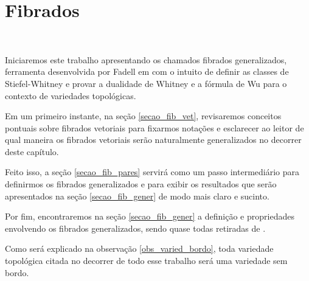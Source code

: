 \documentclass[12pt,oneside]{book} %
\begin{document}





\chapter{Fibrados}\label{cap_fib}
\thispagestyle{empty}

\

\par Iniciaremos este trabalho apresentando os chamados fibrados generalizados, ferramenta desenvolvida por Fadell em \cite{fadell_1} com o intuito de definir as classes de Stiefel-Whitney e provar a dualidade de Whitney e a fórmula de Wu para o contexto de variedades topológicas.

\par Em um primeiro instante, na seção \ref{secao_fib_vet}, revisaremos conceitos pontuais sobre fibrados vetoriais para fixarmos notações e esclarecer ao leitor de qual maneira os fibrados vetoriais serão naturalmente generalizados no decorrer deste capítulo.

\par Feito isso, a seção \ref{secao_fib_pares} servirá como um passo intermediário para definirmos os fibrados generalizados e para exibir os resultados que serão apresentados na seção \ref{secao_fib_gener} de modo mais claro e sucinto.

\par Por fim, encontraremos na seção \ref{secao_fib_gener} a definição e propriedades envolvendo os fibrados generalizados, sendo quase todas retiradas de \cite{fadell_1}.

\par Como será explicado na observação \ref{obs_varied_bordo}, toda variedade topológica citada no decorrer de todo esse trabalho será uma variedade sem bordo.
\end{document}

